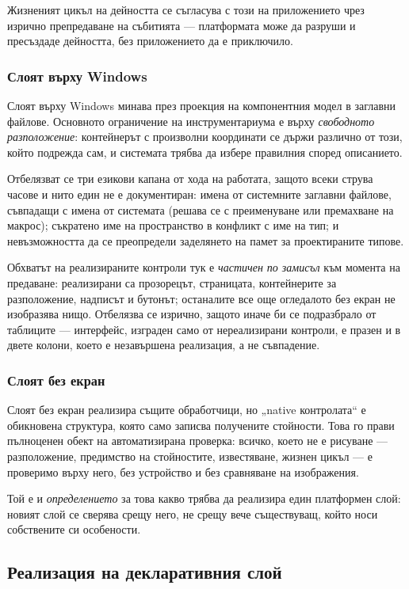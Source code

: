 Жизненият цикъл на дейността се съгласува с този на приложението чрез изрично препредаване
на събитията --- платформата може да разруши и пресъздаде дейността, без приложението да е
приключило.

\subsubsection{Слоят върху Windows}
Слоят върху Windows минава през проекция на компонентния модел в заглавни файлове.
Основното ограничение на инструментариума е върху \emph{свободното разположение}:
контейнерът с произволни координати се държи различно от този, който подрежда сам, и
системата трябва да избере правилния според описанието.

Отбелязват се три езикови капана от хода на работата, защото всеки струва часове и нито
един не е документиран: имена от системните заглавни файлове, съвпадащи с имена от
системата (решава се с преименуване или премахване на макрос); съкратено име на
пространство в конфликт с име на тип; и невъзможността да се преопредели заделянето на
памет за проектираните типове.

Обхватът на реализираните контроли тук е \emph{частичен по замисъл} към момента на
предаване: реализирани са прозорецът, страницата, контейнерите за разположение, надписът и
бутонът; останалите все още огледалото без екран не изобразява нищо. Отбелязва се изрично,
защото иначе би се подразбрало от таблиците --- интерфейс, изграден само от нереализирани
контроли, е празен и в двете колони, което е незавършена реализация, а не съвпадение.

\subsubsection{Слоят без екран}
Слоят без екран реализира същите обработчици, но „native контролата“ е обикновена
структура, която само записва получените стойности. Това го прави пълноценен обект на
автоматизирана проверка: всичко, което не е рисуване --- разположение, предимство на
стойностите, известяване, жизнен цикъл --- е проверимо върху него, без устройство и без
сравняване на изображения.

Той е и \emph{определението} за това какво трябва да реализира един платформен слой: новият
слой се сверява срещу него, не срещу вече съществуващ, който носи собствените си
особености.

\subsection{Реализация на декларативния слой}
\label{subsec:xaml_impl}

